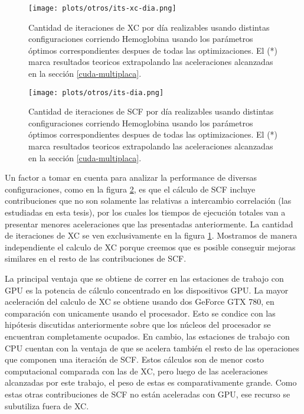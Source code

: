\begin{figure}[htbp]
    \centering
    \texttt{[image: plots/otros/its-xc-dia.png]}
    \caption{Cantidad de iteraciones de XC por d\'ia realizables usando distintas configuraciones corriendo Hemoglobina usando los
              par\'ametros \'optimos correspondientes despues de todas las optimizaciones. El (*) marca resultados teoricos extrapolando
              las aceleraciones alcanzadas en la secci\'on \ref{cuda-multiplaca}.}
    \label{fig:its-xc-dia}
\end{figure}


\begin{figure}[htbp]
    \centering
    \texttt{[image: plots/otros/its-dia.png]}
    \caption{Cantidad de iteraciones de SCF por d\'ia realizables usando distintas configuraciones corriendo Hemoglobina usando los
              par\'ametros \'optimos correspondientes despues de todas las optimizaciones. El (*) marca resultados teoricos extrapolando
              las aceleraciones alcanzadas en la secci\'on \ref{cuda-multiplaca}.}
    \label{fig:its-dia}
\end{figure}

Un factor a tomar en cuenta para analizar la performance de diversas configuraciones, como en la figura \ref{fig:its-dia},
es que el c\'alculo de SCF incluye contribuciones que no son solamente las relativas a intercambio correlaci\'on
(las estudiadas en esta tesis), por los cuales los tiempos de ejecuci\'on totales van
a presentar menores aceleraciones que las presentadas anteriormente. La cantidad de iteraciones de XC se ven
exclusivamente en la figura \ref{fig:its-xc-dia}. Mostramos de manera independiente el calculo de XC porque
creemos que es posible conseguir mejoras similares en el resto de las contribuciones de SCF.

La principal ventaja que se obtiene de correr en las estaciones de trabajo con GPU es la potencia
de c\'alculo concentrado en los dispositivos GPU. La mayor aceleraci\'on del calculo de XC se obtiene
usando dos GeForce GTX 780, en comparaci\'on con unicamente usando el procesador. Esto se condice con las hip\'otesis discutidas
anteriormente sobre que los n\'ucleos del procesador se encuentran completamente ocupados.
En cambio, las estaciones de trabajo con CPU cuentan con la ventaja de que se acelera tambi\'en el
resto de las operaciones que componen una iteraci\'on de SCF. Estos c\'alculos son de menor costo computacional
comparada con las de XC, pero luego de las aceleraciones alcanzadas por este trabajo, el peso de estas
es comparativamente grande. Como estas otras contribuciones de SCF no est\'an
aceleradas con GPU, ese recurso se subutiliza fuera de XC.

